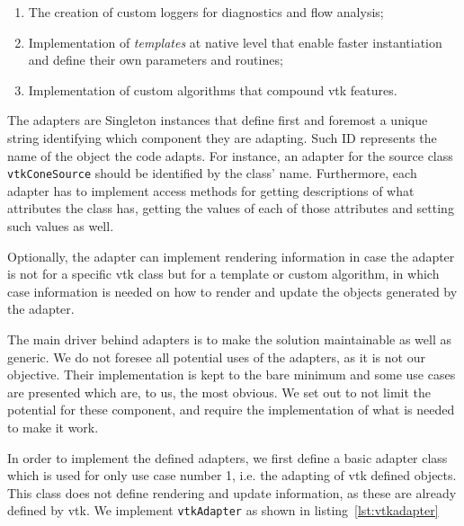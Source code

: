\begin{enumerate}
    \item The creation of custom loggers for diagnostics and flow analysis;
    \item Implementation of \textit{templates} at native level that enable faster instantiation and define their own parameters and routines;
    \item Implementation of custom algorithms that compound \acrshort{vtk} features.
\end{enumerate}

The adapters are Singleton instances that define first and foremost a unique string identifying which component they are adapting. Such ID represents the name of the object the code adapts. For instance, an adapter for the  source class \verb|vtkConeSource| should be identified by the class' name. Furthermore, each adapter has to implement access methods for getting descriptions of what attributes the class has, getting the values of each of those attributes and setting such values as well. 

Optionally, the adapter can implement rendering information in case the adapter is not for a specific \acrshort{vtk} class but for a template or custom algorithm, in which case information is needed on how to render and update the objects generated by the adapter.

The main driver behind adapters is to make the solution maintainable as well as generic. We do not foresee all potential uses of the adapters, as it is not our objective. Their implementation is kept to the bare minimum and some use cases are presented which are, to us, the most obvious. We set out to not limit the potential for these component, and require the implementation of what is needed to make it work.

In order to implement the defined adapters, we first define a basic adapter class which is used for only use case number 1, i.e. the adapting of \acrshort{vtk} defined objects. This class does not define rendering and update information, as these are already defined by \acrshort{vtk}. We implement \verb|vtkAdapter| as shown in listing~\ref{lst:vtkadapter}

